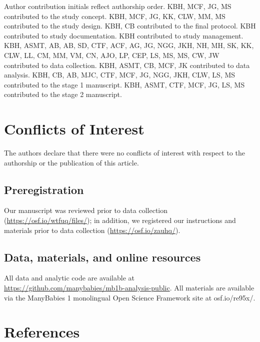 \documentclass[english,,man,floatsintext]{apa6}
\begin{document}
Author contribution initials reflect authorship order. KBH, MCF, JG, MS contributed to the study concept. KBH, MCF, JG, KK, CLW, MM, MS contributed to the study design. KBH, CB contributed to the final protocol. KBH contributed to study documentation. KBH contributed to study management. KBH, ASMT, AB, AB, SD, CTF, ACF, AG, JG, NGG, JKH, NH, MH, SK, KK, CLW, LL, CM, MM, VM, CN, AJO, LP, CEP, LS, MS, MS, CW, JW contributed to data collection. KBH, ASMT, CB, MCF, JK contributed to data analysis. KBH, CB, AB, MJC, CTF, MCF, JG, NGG, JKH, CLW, LS, MS contributed to the stage 1 manuscript. KBH, ASMT, CTF, MCF, JG, LS, MS contributed to the stage 2 manuscript.

\hypertarget{conflicts-of-interest}{%
\section{Conflicts of Interest}\label{conflicts-of-interest}}

The authors declare that there were no conflicts of interest with respect to the authorship or the publication of this article.

\hypertarget{preregistration}{%
\subsection{Preregistration}\label{preregistration}}

Our manuscript was reviewed prior to data collection (\url{https://osf.io/wtfuq/files/}); in addition, we registered our instructions and materials prior to data collection (\url{https://osf.io/zauhq/}).

\hypertarget{data-materials-and-online-resources}{%
\subsection{Data, materials, and online resources}\label{data-materials-and-online-resources}}

All data and analytic code are available at \url{https://github.com/manybabies/mb1b-analysis-public}. All materials are available via the ManyBabies 1 monolingual Open Science Framework site at osf.io/re95x/.

\newpage

\hypertarget{references}{%
\section{References}\label{references}}
\end{document}
